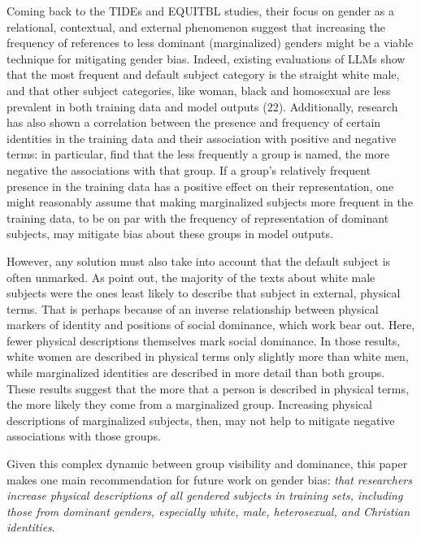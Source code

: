 \documentclass[11pt]{article}
\begin{document}
Coming back to the TIDEs and EQUITBL studies, their focus on gender as a relational, contextual, and external phenomenon suggest that increasing the frequency of references to less dominant (marginalized) genders might be a viable technique for mitigating gender bias. Indeed, existing evaluations of LLMs show that the most frequent and default subject category is the straight white male, and that other subject categories, like woman, black and homosexual are less prevalent in both training data and model outputs (22). Additionally, research has also shown a correlation between the presence and frequency of certain identities in the training data and their association with positive and negative terms: \citet{loon:2022} in particular, find that the less frequently a group is named, the more negative the associations with that group. If a group’s relatively frequent presence in the training data has a positive effect on their representation, one might reasonably assume that making marginalized subjects more frequent in the training data, to be on par with the frequency of representation of dominant subjects, may mitigate bias about these groups in model outputs. 

However, any solution must also take into account that the default subject is often unmarked. As \citet{devinney:2024} point out, the majority of the texts about white male subjects were the ones least likely to describe that subject in external, physical terms. That is perhaps because of an inverse relationship between physical markers of identity and positions of social dominance, which \citet{devinney:2024} work bear out. Here, fewer physical descriptions themselves mark social dominance. In those results, white women are described in physical terms only slightly more than white men, while marginalized identities are described in more detail than both groups. These results suggest that the more that a person is described in physical terms, the more likely they come from a marginalized group. Increasing physical descriptions of marginalized subjects, then, may not help to mitigate negative associations with those groups. 

Given this complex dynamic between group visibility and dominance, this paper makes one main recommendation for future work on gender bias: \textit{that researchers increase physical descriptions of all gendered subjects in training sets, including those from dominant genders, especially white, male, heterosexual, and Christian identities}. 
\end{document}
